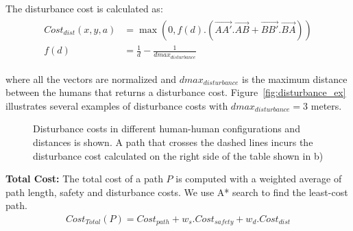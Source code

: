 The disturbance cost is calculated as:
\begin{align} 
\begin{split} 
Cost_{dist}(x,y,a)&=\max(0, f(d).(\vec{AA'}.\vec{AB}+\vec{BB'}.\vec{BA})) \\
f(d)&=\frac{1}{d}-\frac{1}{dmax_{disturbance}}
\end{split} 
\end{align}

where all the vectors are normalized and $dmax_{disturbance}$ is the maximum distance between the humans that returns a disturbance cost. Figure~\ref{fig:disturbance_ex} illustrates several examples of disturbance costs with $dmax_{disturbance}=3$ meters.

\begin{figure}[ht!]
\centering
%
    \caption{%
	Disturbance costs in different human-human configurations and distances is shown. A path that crosses the dashed lines incurs the disturbance cost calculated on the right side of the table shown in b)
     }%
   \label{fig:sim}
   \vspace{-0.2cm}
\end{figure}

\textbf{Total Cost:} The total cost of a path $P$ is computed with a weighted average of path length, safety and disturbance costs. We use A* search to find the least-cost path.
\begin{align}
Cost_{Total}(P) = Cost_{path}+w_{s}.Cost_{safety} + w_d.Cost_{dist}
\end{align}

